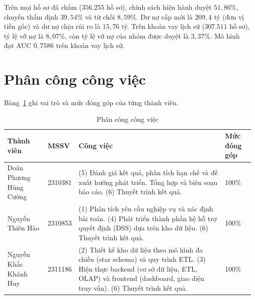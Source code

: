 \medskip

Trên mọi hồ sơ đã chấm ($356.255$ hồ sơ), chính sách hiện hành duyệt $51{,}86\%$, chuyển thẩm định $39{,}54\%$ và từ chối $8{,}59\%$. Dư nợ cấp mới là $209{,}4$ tỷ (đơn vị tiền gốc) và dư nợ chịu rủi ro là $15{,}76$ tỷ. Trên khoản vay lịch sử ($307.511$ hồ sơ), tỷ lệ vỡ nợ là $8{,}07\%$, còn tỷ lệ vỡ nợ của nhóm được duyệt là $3{,}37\%$. Mô hình đạt AUC $0{,}7586$ trên khoản vay lịch sử.

\newpage\part*{Phân công công việc}
Bảng~\ref{tab:task-assignment} ghi vai trò và mức đóng góp của từng thành viên.

\begin{table}[H]
	\centering
	\caption{Phân công công việc}
	\label{tab:task-assignment}
	\footnotesize
	\begin{tabular}{p{3.8cm} p{2.2cm} p{6.2cm} p{2.6cm}}
		\toprule
		\textbf{Thành viên}    & \textbf{MSSV} & \textbf{Công việc} & \textbf{Mức đóng góp} \\
		\midrule
		Doãn Phương Hùng Cường & 2310381       & (5) Đánh giá kết quả, phân tích hạn chế và đề xuất hướng phát triển. \newline Tổng hợp và biên soạn báo cáo. \newline (6) Thuyết trình kết quả.                                                          & 100\% \\
		\midrule
		Nguyễn Thiên Hào       & 2310853       & (1) Phân tích yêu cầu nghiệp vụ và xác định bài toán. \newline (4) Phát triển thành phần hệ hỗ trợ quyết định (DSS) dựa trên kho dữ liệu. \newline (6) Thuyết trình kết quả.                     & 100\% \\
		\midrule
		Nguyễn Khắc Khánh Huy  & 2311186       & (2) Thiết kế kho dữ liệu theo mô hình đa chiều (star schema) và quy trình ETL. \newline (3) Hiện thực backend (cơ sở dữ liệu, ETL, OLAP) và frontend (dashboard, giao diện truy vấn). \newline (6) Thuyết trình kết quả. & 100\% \\
		\bottomrule
	\end{tabular}
\end{table}
